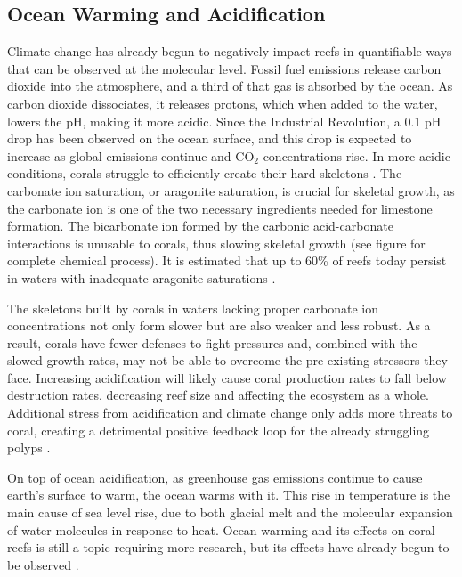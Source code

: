 \documentclass{book}\usepackage{knitr}
\begin{document}
\begin{knitrout}
\begin{kframe}
\subsection{Ocean Warming and Acidification}

Climate change has already begun to negatively impact reefs in quantifiable ways that can be observed at the molecular level. Fossil fuel emissions release carbon dioxide into the atmosphere, and a third of that gas is absorbed by the ocean\citep{Keller2009ClimateCC}. As carbon dioxide dissociates, it releases protons, which when added to the water, lowers the pH, making it more acidic. Since the Industrial Revolution, a 0.1 pH drop has been observed on the ocean surface, and this drop is expected to increase as global emissions continue and CO$_2$ concentrations rise. In more acidic conditions, corals struggle to efficiently create their hard skeletons \citep{Keller2009ClimateCC}. The carbonate ion saturation, or aragonite saturation, is crucial for skeletal growth, as the carbonate ion is one of the two necessary ingredients needed for limestone formation. The bicarbonate ion formed by the carbonic acid-carbonate interactions is unusable to corals, thus slowing skeletal growth (see figure for complete chemical process). It is estimated that up to 60\% of reefs today persist in waters with inadequate aragonite saturations \citep{Ayala_2009}.

The skeletons built by corals in waters lacking proper carbonate ion concentrations not only form slower but are also weaker and less robust.  As a result, corals have fewer defenses to fight pressures and, combined with the slowed growth rates, may not be able to overcome the pre-existing stressors they face. Increasing acidification will likely cause coral production rates to fall below destruction rates, decreasing reef size and affecting the ecosystem as a whole. Additional stress from acidification and climate change only adds more threats to coral, creating a detrimental positive feedback loop for the already struggling polyps \citep{Ayala_2009}.

On top of ocean acidification, as greenhouse gas emissions continue to cause earth’s surface to warm, the ocean warms with it. This rise in temperature is the main cause of sea level rise, due to both glacial melt and the molecular expansion of water molecules in response to heat. Ocean warming and its effects on coral reefs is still a topic requiring more research, but its effects have already begun to be observed \citep{wwfindex}.


\end{kframe}
\end{knitrout}
\end{document}
